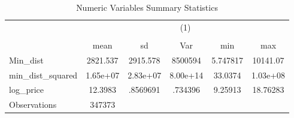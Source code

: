 {
\def\sym#1{\ifmmode^{#1}\else\(^{#1}\)\fi}
\begin{longtable}{l*{1}{ccccc}}
\caption{Numeric Variables Summary Statistics}\\
\toprule\endfirsthead\midrule\endhead\midrule\endfoot\endlastfoot
                    &\multicolumn{5}{c}{(1)}                                         \\
                    &\multicolumn{5}{c}{}                                            \\
                    &        mean&          sd&         Var&         min&         max\\
\midrule
Min\_dist            &    2821.537&    2915.578&     8500594&    5.747817&    10141.07\\
min\_dist\_squared    &    1.65e+07&    2.83e+07&    8.00e+14&     33.0374&    1.03e+08\\
log\_price           &     12.3983&    .8569691&     .734396&     9.25913&    18.76283\\
\midrule
Observations        &      347373&            &            &            &            \\
\bottomrule
\end{longtable}
}
